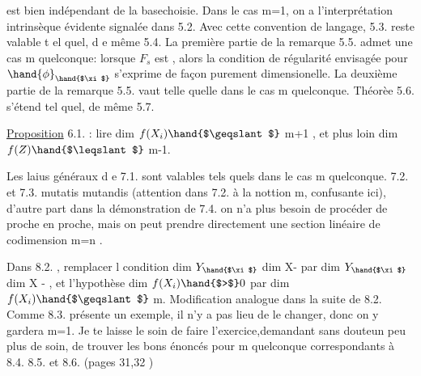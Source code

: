 
est bien indépendant de la base\hand{/}choisie.  Dans le cas  m=1, on a
l'interprétation intrinsèque évidente signalée dans 5.2.  Avec cette
convention de langage, 5.3.  reste valable t el quel, d e même 5.4.
La première partie de la remarque 5.5.   admet une  
 cas m quelconque:  lorsque $F_s$  est  , alors la condition de
régularité envisagée pour $\hand{\phi}_{\hand{$\xi$}}$  s'exprime de façon purement dimensionelle.
La deuxième partie de la remarque 5.5. vaut telle quelle dans le cas
m quelconque.      Théorèe 5.6.  s'étend tel quel,  de même 5.7.

\uline{Proposition} 6.1.  :  lire   dim $f(X_i) \hand{$\geqslant$}$  m+1 ,  et
plus loin   dim $f(Z) \hand{$\leqslant$}$ m-1.

Les laius généraux d e 7.1. sont valables tels quels dans le cas
m quelconque.  7.2. et 7.3.  mutatis mutandis (attention dans 7.2.
à la nottion m, confusante ici),  d'autre part dans la démonstration
de 7.4. on n'a plus besoin de procéder de proche en proche, mais on
peut prendre directement une section linéaire  de codimension m=n .

Dans 8.2. , remplacer l condition    dim $Y_{\hand{$\xi$}}$ \hand{$>$} dim X-
par  dim $Y_{\hand{$\xi$}}$ \hand{$>$}  dim X  -  , et l'hypothèse  dim $f(X_i) \hand{$>$} 0$  par
dim $f(X_i) \hand{$\geqslant$}$ m.   Modification analogue dans la suite de 8.2.  Comme
8.3.  présente un exemple, il n'y a pas lieu de le changer, donc on
y gardera m=1.   Je te laisse le soin de faire l'exercice,demandant
sans doute\hand{/}un peu plus de soin, de trouver  les bons énoncés pour m
quelconque correspondants à  8.4.  8.5.  et 8.6.   (pages 31,32 )\hand{;}


